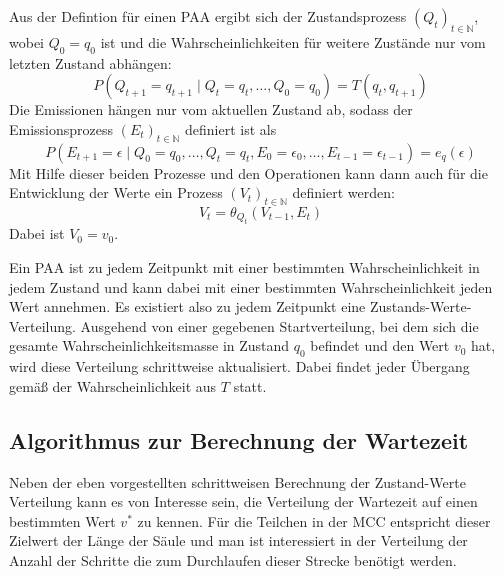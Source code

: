 Aus der Defintion für einen PAA ergibt sich der Zustandsprozess $(Q_t)_{t\in\mathbb{N}}$, wobei $Q_0 = q_0$ ist und die Wahrscheinlichkeiten für weitere Zustände nur vom letzten Zustand abhängen: 
\begin{equation}
P(Q_{t+1} = q_{t+1} \mid Q_t = q_t, \ldots, Q_0 = q_0) = T(q_t, q_{t+1})
\end{equation}
Die Emissionen hängen nur vom aktuellen Zustand ab, sodass der Emissionsprozess $(E_t)_{t\in\mathbb{N}}$ definiert ist als 
\begin{equation}
P(E_{t+1} = \epsilon \mid Q_0 = q_0, \ldots, Q_t = q_t, E_0 = \epsilon_0, \ldots, E_{t-1} = \epsilon_{t-1}) = e_q(\epsilon)
\end{equation}
Mit Hilfe dieser beiden Prozesse und den Operationen kann dann auch für die Entwicklung der Werte ein Prozess $(V_t)_{t\in\mathbb{N}}$ definiert werden:
\begin{equation}
V_t = \theta_{Q_t}(V_{t-1}, E_t)
\end{equation}
Dabei ist $V_0 = v_0$.

Ein PAA ist zu jedem Zeitpunkt mit einer bestimmten Wahrscheinlichkeit in jedem Zustand und kann dabei mit einer bestimmten Wahrscheinlichkeit jeden Wert annehmen. Es existiert also zu jedem Zeitpunkt eine Zustands-Werte-Verteilung. Ausgehend von einer gegebenen Startverteilung, bei dem sich die gesamte Wahrscheinlichkeitsmasse in Zustand $q_0$ befindet und den Wert $v_0$ hat, wird diese Verteilung schrittweise aktualisiert. Dabei findet jeder Übergang gemäß der Wahrscheinlichkeit aus $T$ statt. %

% 
% 
% 

\subsection{Algorithmus zur Berechnung der Wartezeit}

Neben der eben vorgestellten schrittweisen Berechnung der Zustand-Werte Verteilung kann es von Interesse sein, die Verteilung der Wartezeit auf einen bestimmten Wert $v^*$ zu kennen. Für die Teilchen in der MCC entspricht dieser Zielwert der Länge der Säule und man ist interessiert in der Verteilung der Anzahl der Schritte die zum Durchlaufen dieser Strecke benötigt werden. 

